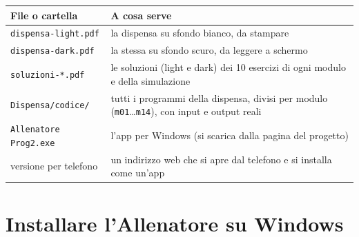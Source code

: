\begin{center}
\begin{tabular}{p{4.6cm}p{9.6cm}}
\toprule
\textbf{File o cartella} & \textbf{A cosa serve} \\
\midrule
\texttt{dispensa-light.pdf} & la dispensa su sfondo bianco, da stampare \\
\texttt{dispensa-dark.pdf} & la stessa su sfondo scuro, da leggere a schermo \\
\texttt{soluzioni-*.pdf} & le soluzioni (light e dark) dei 10 esercizi di ogni modulo e della simulazione \\
\texttt{Dispensa/codice/} & tutti i programmi della dispensa, divisi per modulo (\texttt{m01}\ldots\texttt{m14}), con input e output reali \\
\texttt{Allenatore Prog2.exe} & l'app per Windows (si scarica dalla pagina del progetto) \\
versione per telefono & un indirizzo web che si apre dal telefono e si installa come un'app \\
\bottomrule
\end{tabular}
\end{center}

\section*{Installare l'Allenatore su Windows}

